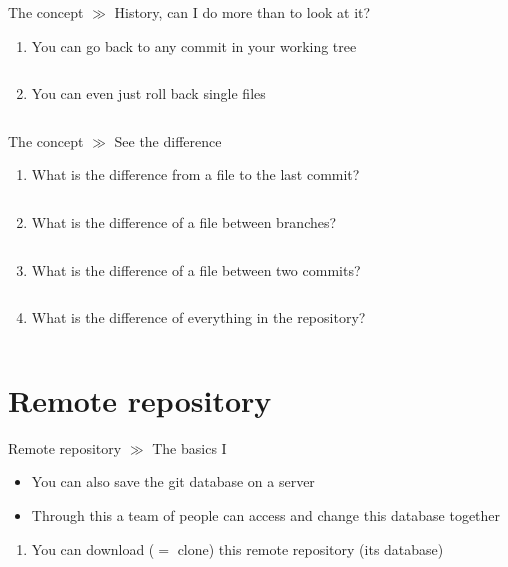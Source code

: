 \documentclass[10pt]{beamer}
\begin{document}
\begin{frame}{The concept $\gg$ History, can I do more than to look at it?}
	\begin{enumerate}
		\item You can go back to any commit in your working tree
		\inputminted[bgcolor=lightGreyCustom,fontsize=\scriptsize]{sh}{./resources/git_checkout_01_repo.sh}
		\item You can even just roll back single files
		\inputminted[bgcolor=lightGreyCustom,fontsize=\scriptsize]{sh}{./resources/git_checkout_02_single_file.sh}
	\end{enumerate}
\end{frame}

\begin{frame}{The concept $\gg$ See the difference}
\begin{enumerate}
	\item What is the difference from a file to the last commit?
	\inputminted[bgcolor=lightGreyCustom,fontsize=\scriptsize]{sh}{./resources/git_diff_01_file.sh}
	\item What is the difference of a file between branches?
	\inputminted[bgcolor=lightGreyCustom,fontsize=\scriptsize]{sh}{./resources/git_diff_02_file_branches.sh}
	\item What is the difference of a file between two commits?
	\inputminted[bgcolor=lightGreyCustom,fontsize=\scriptsize]{sh}{./resources/git_diff_03_file_commits.sh}
	\item What is the difference of everything in the repository?
	\inputminted[bgcolor=lightGreyCustom,fontsize=\scriptsize]{sh}{./resources/git_diff_04_everything.sh}
\end{enumerate}
\end{frame}

\section{Remote repository}

\begin{frame}{Remote repository $\gg$ The basics I}
	\begin{itemize}
		\item You can also save the git database on a server
		\item Through this a team of people can access and change this database together
	\end{itemize}
	\begin{enumerate}
		\item You can download ($=$ clone) this remote repository (its database)
		\inputminted[bgcolor=lightGreyCustom,fontsize=\scriptsize]{sh}{./resources/git_remote_repository_01_clone.sh}
	\end{enumerate}
\end{frame}
\end{document}

